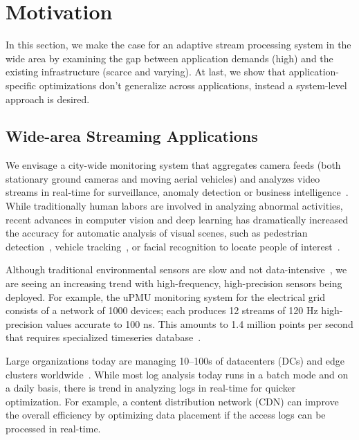 \section{Motivation}
\label{sec:motivation}

In this section, we make the case for an adaptive stream processing system in
the wide area by examining the gap between application demands (high) and the
existing infrastructure (scarce and varying). At last, we show that
application-specific optimizations don't generalize across applications, instead
a system-level approach is desired.

\subsection{Wide-area Streaming Applications}
\label{sec:wide-area-streaming}

 We envisage a city-wide monitoring system that
aggregates camera feeds (both stationary ground cameras and moving aerial
vehicles) and analyzes video streams in real-time for surveillance, anomaly
detection or business intelligence~\cite{oh2011large}. While traditionally human
labors are involved in analyzing abnormal activities, recent advances in
computer vision and deep learning has dramatically increased the accuracy for
automatic analysis of visual scenes, such as pedestrian
detection~\cite{dollar2012pedestrian}, vehicle tracking~\cite{coifman1998real},
or facial recognition to locate people of interest~\cite{parkhi2015deep,
  Lu:2015:SHF:2888116.2888245}.

 Although traditional environmental sensors
are slow and not data-intensive~\cite{atzori2010internet}, we are seeing an
increasing trend with high-frequency, high-precision sensors being deployed. For
example, the uPMU monitoring system for the electrical grid consists of a
network of 1000 devices; each produces 12 streams of 120 Hz high-precision
values accurate to 100 ns. This amounts to 1.4 million points per second that
requires specialized timeseries database~\cite{andersen2016btrdb}.

 Large organizations today are managing 10--100s of
datacenters (DCs) and edge clusters worldwide~\cite{calder2013mapping}. While
most log analysis today runs in a batch mode and on a daily basis, there is
trend in analyzing logs in real-time for quicker optimization. For example, a
content distribution network (CDN) can improve the overall efficiency by
optimizing data placement if the access logs can be processed in real-time.


